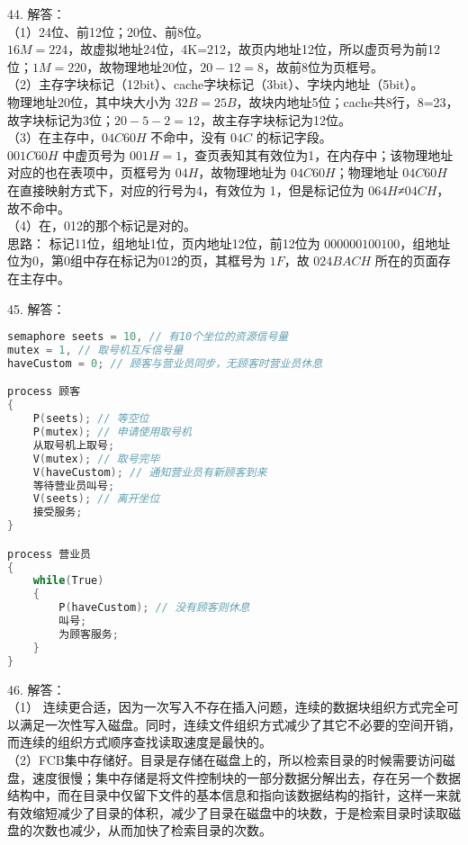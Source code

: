 44. 解答： \\
（1）24位、前12位；20位、前8位。 \\
$16M=224$，故虚拟地址24位，4K=212，故页内地址12位，所以虚页号为前12位；$1M=220$，故物理地址20位，$20-12=8$，故前8位为页框号。 \\
（2）主存字块标记（12bit）、cache字块标记（3bit）、字块内地址（5bit）。 \\
物理地址20位，其中块大小为 $32B=25B$，故块内地址5位；cache共8行，8=23，故字块标记为3位；$20-5-2=12$，故主存字块标记为12位。 \\
（3）在主存中，$04C60H$ 不命中，没有 $04C$ 的标记字段。 \\
$001C60H$ 中虚页号为 $001H=1$，查页表知其有效位为1，在内存中；该物理地址对应的也在表项中，页框号为 $04H$，故物理地址为 $04C60H$；物理地址 $04C60H$ 在直接映射方式下，对应的行号为4，有效位为 1，但是标记位为 $064H$≠$04CH$，故不命中。 \\
（4）在，012的那个标记是对的。 \\
思路： 标记11位，组地址1位，页内地址12位，前12位为 $0000 0010 0100$，组地址位为0，第0组中存在标记为012的页，其框号为 $1F$，故 $024BACH$ 所在的页面存在主存中。

45. 解答： \\
\begin{lstlisting}[language=cpp]
semaphore seets = 10, // 有10个坐位的资源信号量
mutex = 1, // 取号机互斥信号量
haveCustom = 0; // 顾客与营业员同步，无顾客时营业员休息

process 顾客
{
    P(seets); // 等空位
    P(mutex); // 申请使用取号机
    从取号机上取号;
    V(mutex); // 取号完毕
    V(haveCustom); // 通知营业员有新顾客到来
    等待营业员叫号;
    V(seets); // 离开坐位
    接受服务;
}

process 营业员
{
    while(True)
    {
        P(haveCustom); // 没有顾客则休息
        叫号;
        为顾客服务;
    }
}
\end{lstlisting}

46. 解答： \\
（1） 连续更合适，因为一次写入不存在插入问题，连续的数据块组织方式完全可以满足一次性写入磁盘。同时，连续文件组织方式减少了其它不必要的空间开销，而连续的组织方式顺序查找读取速度是最快的。 \\
（2）FCB集中存储好。目录是存储在磁盘上的，所以检索目录的时候需要访问磁盘，速度很慢；集中存储是将文件控制块的一部分数据分解出去，存在另一个数据结构中，而在目录中仅留下文件的基本信息和指向该数据结构的指针，这样一来就有效缩短减少了目录的体积，减少了目录在磁盘中的块数，于是检索目录时读取磁盘的次数也减少，从而加快了检索目录的次数。


